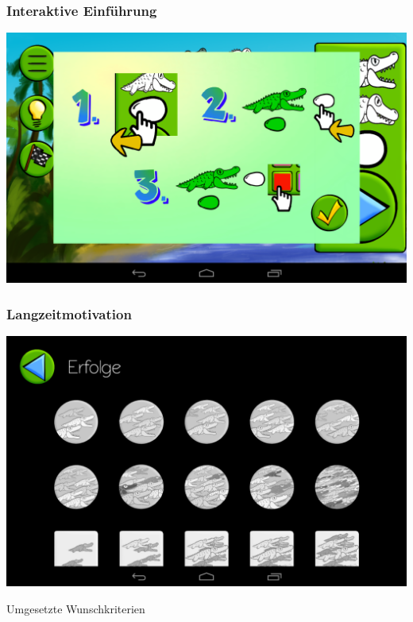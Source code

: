 \documentclass[t]{beamer}
\begin{document}
\begin{frame}
	\frametitle{Interaktive Einführung}
	\includegraphics[width=\textwidth]{images/screenshots/tutorial}
\end{frame}

\begin{frame}
	\frametitle{Langzeitmotivation}
	\includegraphics[width=\textwidth]{images/screenshots/achievements}
\end{frame}

\begin{frame}[c]
	\begin{center}
	\Huge
	Umgesetzte Wunschkriterien
	\end{center}
\end{frame}
\end{document}
